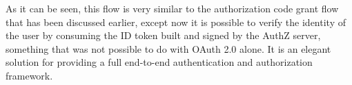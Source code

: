 As it can be seen, this flow is very similar to the authorization code grant flow that has been discussed earlier, except now it is possible to verify the identity of the user by consuming the ID token built and signed by the AuthZ server, something that was not possible to do with OAuth 2.0 alone. It is an elegant solution for providing a full end-to-end authentication and authorization framework.